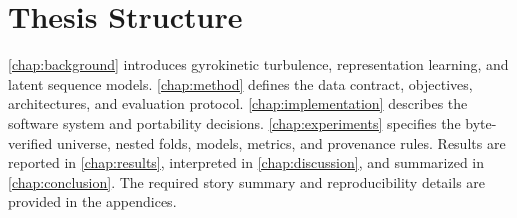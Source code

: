 \section{Thesis Structure}

\autoref{chap:background} introduces gyrokinetic turbulence, representation learning, and latent
sequence models. \autoref{chap:method} defines the data contract, objectives, architectures, and
evaluation protocol. \autoref{chap:implementation} describes the software system and portability
decisions. \autoref{chap:experiments} specifies the byte-verified universe, nested folds, models,
metrics, and provenance rules. Results are reported in \autoref{chap:results}, interpreted in
\autoref{chap:discussion}, and summarized in \autoref{chap:conclusion}. The required story summary
and reproducibility details are provided in the appendices.
